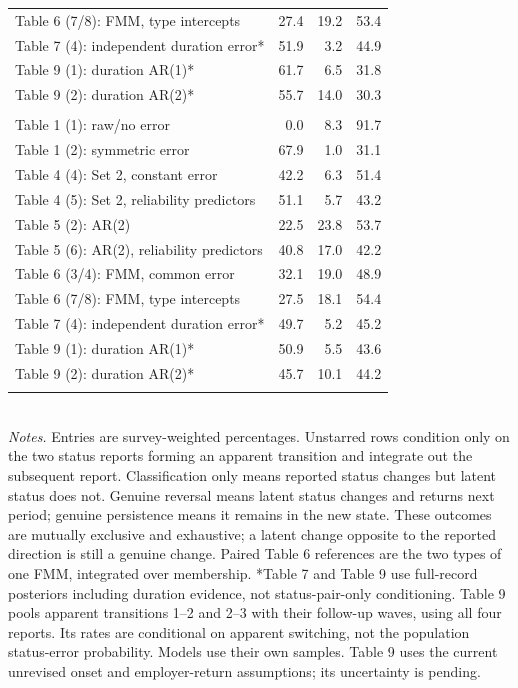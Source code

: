 \begin{table}[H]
\begin{tabular}{@{}lrrr@{}}
\addlinespace[1pt]
Table 6 (7/8): FMM, type intercepts & 27.4 & 19.2 & 53.4 \\
\addlinespace[1pt]
Table 7 (4): independent duration error* & 51.9 & 3.2 & 44.9 \\
\addlinespace[1pt]
Table 9 (1): duration AR(1)* & 61.7 & 6.5 & 31.8 \\
\addlinespace[1pt]
Table 9 (2): duration AR(2)* & 55.7 & 14.0 & 30.3 \\
\addlinespace[1pt]
\addlinespace
\multicolumn{4}{l}{\textit{Apparent exits}} \\
Table 1 (1): raw/no error & 0.0 & 8.3 & 91.7 \\
\addlinespace[1pt]
Table 1 (2): symmetric error & 67.9 & 1.0 & 31.1 \\
\addlinespace[1pt]
Table 4 (4): Set 2, constant error & 42.2 & 6.3 & 51.4 \\
\addlinespace[1pt]
Table 4 (5): Set 2, reliability predictors & 51.1 & 5.7 & 43.2 \\
\addlinespace[1pt]
Table 5 (2): AR(2) & 22.5 & 23.8 & 53.7 \\
\addlinespace[1pt]
Table 5 (6): AR(2), reliability predictors & 40.8 & 17.0 & 42.2 \\
\addlinespace[1pt]
Table 6 (3/4): FMM, common error & 32.1 & 19.0 & 48.9 \\
\addlinespace[1pt]
Table 6 (7/8): FMM, type intercepts & 27.5 & 18.1 & 54.4 \\
\addlinespace[1pt]
Table 7 (4): independent duration error* & 49.7 & 5.2 & 45.2 \\
\addlinespace[1pt]
Table 9 (1): duration AR(1)* & 50.9 & 5.5 & 43.6 \\
\addlinespace[1pt]
Table 9 (2): duration AR(2)* & 45.7 & 10.1 & 44.2 \\
\addlinespace[1pt]
\bottomrule
\end{tabular}\\[4pt]
{\footnotesize\textit{Notes.} Entries are survey-weighted percentages. Unstarred rows condition only on the two status reports forming an apparent transition and integrate out the subsequent report. Classification only means reported status changes but latent status does not. Genuine reversal means latent status changes and returns next period; genuine persistence means it remains in the new state. These outcomes are mutually exclusive and exhaustive; a latent change opposite to the reported direction is still a genuine change. Paired Table 6 references are the two types of one FMM, integrated over membership. *Table 7 and Table 9 use full-record posteriors including duration evidence, not status-pair-only conditioning. Table 9 pools apparent transitions 1--2 and 2--3 with their follow-up waves, using all four reports. Its rates are conditional on apparent switching, not the population status-error probability. Models use their own samples. Table 9 uses the current unrevised onset and employer-return assumptions; its uncertainty is pending.}
\end{table}
